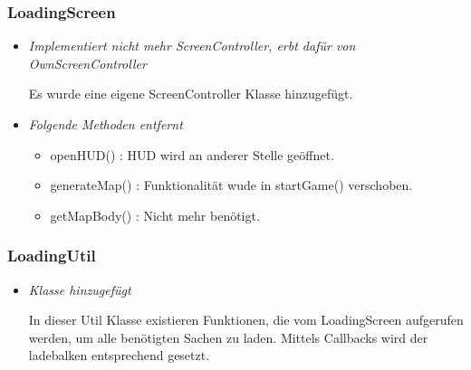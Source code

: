 \subsubsection{LoadingScreen}
\begin{itemize}
    \item \textit{Implementiert nicht mehr ScreenController, erbt dafür von OwnScreenController}
        \begin{leftbar}[0.9\linewidth]
            Es wurde eine eigene ScreenController Klasse hinzugefügt.
        \end{leftbar}
    \item \textit{Folgende Methoden entfernt}
        \begin{itemize}
            \item openHUD() : HUD wird an anderer Stelle geöffnet.
            \item generateMap() : Funktionalität wude in startGame() verschoben.
            \item getMapBody() : Nicht mehr benötigt.
        \end{itemize}
\end{itemize}

\subsubsection{LoadingUtil}
\begin{itemize}
    \item \textit{Klasse hinzugefügt}
        \begin{leftbar}[0.9\linewidth]
            In dieser Util Klasse existieren Funktionen, die vom LoadingScreen aufgerufen 
            werden, um alle benötigten Sachen zu laden. Mittels Callbacks wird der 
            ladebalken entsprechend gesetzt.
        \end{leftbar}
\end{itemize}

